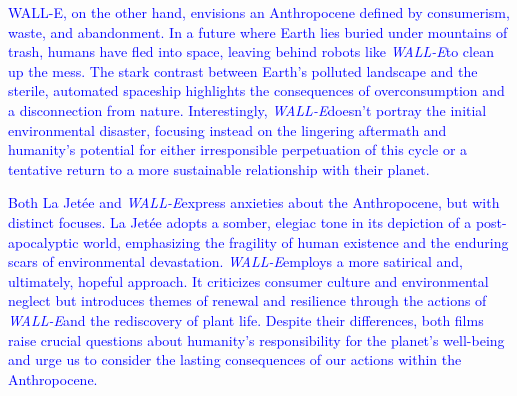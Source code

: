 \documentclass[11pt,fleqn]{book}
\begin{document}
\begin{exercise}
\textcolor{blue}{
WALL-E, on the other hand, envisions an Anthropocene defined by consumerism, waste, and abandonment. In a future where Earth lies buried under mountains of trash, humans have fled into space, leaving behind robots like \textit{WALL-E}to clean up the mess. The stark contrast between Earth's polluted landscape and the sterile, automated spaceship highlights the consequences of overconsumption and a disconnection from nature. Interestingly, \textit{WALL-E}doesn't portray the initial environmental disaster, focusing instead on the lingering aftermath and humanity's potential for either irresponsible perpetuation of this cycle or a tentative return to a more sustainable relationship with their planet.
}

\textcolor{blue}{
Both La Jetée and \textit{WALL-E}express anxieties about the Anthropocene, but with distinct focuses. La Jetée adopts a somber, elegiac tone in its depiction of a post-apocalyptic world, emphasizing the fragility of human existence and the enduring scars of environmental devastation.  \textit{WALL-E}employs a more satirical and, ultimately, hopeful approach.  It criticizes consumer culture and environmental neglect but introduces themes of renewal and resilience through the actions of \textit{WALL-E}and the rediscovery of plant life. Despite their differences, both films raise crucial questions about humanity's responsibility for the planet's well-being and urge us to consider the lasting consequences of our actions within the Anthropocene.
}
\end{exercise}
\end{document}
